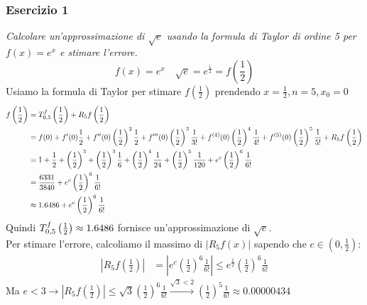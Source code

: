 \documentclass[12pt, a4paper]{report}
\begin{document}
            \subsubsection{Esercizio 1}
                \textit{Calcolare un'approssimazione di $\sqrt{e}$ usando la formula di Taylor di ordine 5 per $f(x)=e^{x}$ e stimare l'errore.}
                \begin{equation*}
                    f(x) = e^{x} \quad \sqrt{e} = e^{\frac{1}{2}} = f\left(\frac{1}{2}\right)
                \end{equation*}
                Usiamo la formula di Taylor per stimare $f\left(\frac{1}{2}\right)$ prendendo $x=\frac{1}{2},n=5,x_{0}=0$
                \footnotesize
                \begin{equation*}
                    \begin{split}
                        f\left(\frac{1}{2}\right) &= \taylor{f}{0}{5}\left(\frac{1}{2}\right) + R_{5}f\left(\frac{1}{2}\right) \\
                        &= f(0)+f'(0)\frac{1}{2}+f''(0)\left(\frac{1}{2}\right)^{2}\frac{1}{2}+f'''(0)\left(\frac{1}{2}\right)^{3}\frac{1}{3!}+f^{(4)}(0)\left(\frac{1}{2}\right)^{4}\frac{1}{4!}+f^{(5)}(0)\left(\frac{1}{2}\right)^{5}\frac{1}{5!}+R_{5}f\left(\frac{1}{2}\right) \\
                        &= 1+\frac{1}{2}+\left(\frac{1}{2}\right)^{3}+\left(\frac{1}{2}\right)^{3}\frac{1}{6}+\left(\frac{1}{2}\right)^{4}\frac{1}{24}+\left(\frac{1}{2}\right)^{5}\frac{1}{120}+ e^{c}\left(\frac{1}{2}\right)^{6}\frac{1}{6!} \\
                        &= \frac{6331}{3840} + e^{c}\left(\frac{1}{2}\right)^{6}\frac{1}{6!} \\
                        &\approx 1.6486 + e^{c}\left(\frac{1}{2}\right)^{6}\frac{1}{6!}
                    \end{split}
                \end{equation*}
                \normalsize
                Quindi $\taylor{f}{0}{5}\left(\frac{1}{2}\right)\approx 1.6486$ fornisce un'approssimazione di $\sqrt{e}$.\\
                Per stimare l'errore, calcoliamo il massimo di $|R_{5}f(x)|$ sapendo che $c \in \left(0,\frac{1}{2}\right)$:
                \begin{equation*}
                    \begin{split}
                        \left|R_{5}f\left(\frac{1}{2}\right)\right| &= \left|e^{c}\left(\frac{1}{2}\right)^{6}\frac{1}{6!}\right| \leq e^{\frac{1}{2}}\left(\frac{1}{2}\right)^{6}\frac{1}{6!}
                    \end{split}
                \end{equation*}
                Ma $e < 3 \rightarrow \left|R_{5}f\left(\frac{1}{2}\right)\right|\leq\sqrt{3}\left(\frac{1}{2}\right)^{6}\frac{1}{6!}\xrightarrow{\sqrt{3} < 2}\left(\frac{1}{2}\right)^{5}\frac{1}{6!}\approx 0.00000434$
\end{document}
